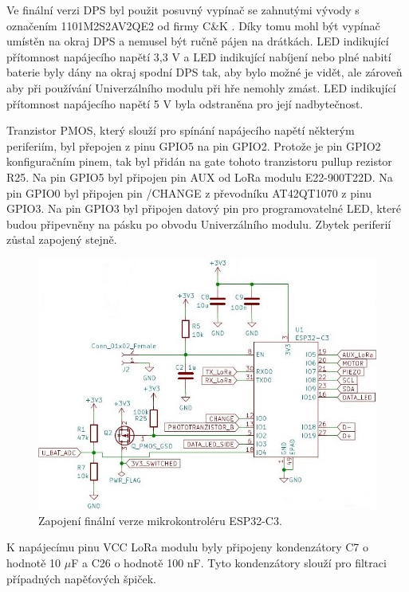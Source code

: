 Ve finální verzi DPS byl použit posuvný vypínač se zahnutými vývody s označením 1101M2S2AV2QE2 od firmy C\&K \cite{vypinac}.
Díky tomu mohl být vypínač umístěn na okraj DPS a nemusel být ručně pájen na drátkách. LED indikující přítomnost napájecího napětí 
3,3 V a LED indikující nabíjení nebo plné nabití baterie byly dány na okraj spodní DPS tak, aby bylo možné je vidět, ale zároveň aby při používání Univerzálního modulu při hře nemohly zmást. LED indikující přítomnost 
napájecího napětí 5 V byla odstraněna pro její nadbytečnost. 

Tranzistor PMOS, který slouží pro spínání napájecího napětí některým periferiím, byl přepojen z pinu GPIO5 na pin GPIO2. Protože je pin GPIO2 konfiguračním pinem, tak byl přidán na gate tohoto tranzistoru pullup 
rezistor R25. Na pin GPIO5 byl připojen pin AUX od LoRa modulu E22-900T22D. Na pin GPIO0 byl připojen pin /CHANGE z převodníku AT42QT1070 z pinu GPIO3. Na pin GPIO3 byl připojen datový pin pro programovatelné LED, 
které budou připevněny na pásku po obvodu Univerzálního modulu. Zbytek periferií zůstal zapojený stejně. 

\begin{figure}[!h]
  \begin{center}
    \includegraphics[scale=0.75]{obrazky/ESP32-C3_final.jpg}
  \end{center}
  \caption[Zapojení finální verze mikrokontroléru ESP32-C3]{Zapojení finální verze mikrokontroléru ESP32-C3.}
\end{figure}

K napájecímu pinu VCC LoRa modulu byly připojeny kondenzátory C7 o hodnotě 10 $\mu$F a C26 o hodnotě 100 nF. Tyto kondenzátory slouží pro filtraci případných napěťových špiček. 

